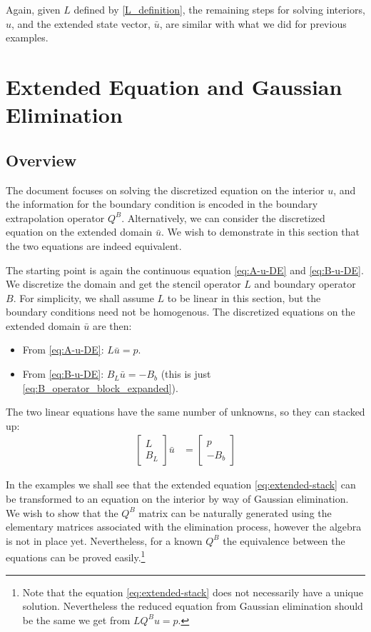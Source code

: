 \documentclass[11pt]{article}
\begin{document}
Again, given $L$ defined by \cref{L_definition}, the remaining steps for solving interiors, $u$, and the extended state vector, $\bar{u}$, are similar with what we did for previous examples.

\appendix
\section{Extended Equation and Gaussian Elimination}
\subsection{Overview}
The document focuses on solving the discretized equation on the interior $u$, and the information for the boundary condition is encoded in the boundary extrapolation operator $Q^B$. Alternatively, we can consider the discretized equation on the extended domain $\bar{u}$. We wish to demonstrate in this section that the two equations are indeed equivalent.

The starting point is again the continuous equation \cref{eq:A-u-DE} and \cref{eq:B-u-DE}. We discretize the domain and get the stencil operator $L$ and boundary operator $B$. For simplicity, we shall assume $L$ to be linear in this section, but the boundary conditions need not be homogenous. The discretized equations on the extended domain $\bar{u}$ are then:
\begin{itemize}
	\item From \cref{eq:A-u-DE}: $L\bar{u} = p$.
	\item From \cref{eq:B-u-DE}: $B_L\bar{u} = -B_b$ (this is just \cref{eq:B_operator_block_expanded}).
\end{itemize}

The two linear equations have the same number of unknowns, so they can stacked up:
\begin{align}
	\begin{bmatrix} L \\ B_L \end{bmatrix} \bar{u} &=
	\begin{bmatrix} p \\ -B_b \end{bmatrix}\label{eq:extended-stack}
\end{align}

In the examples we shall see that the extended equation \cref{eq:extended-stack} can be transformed to an equation on the interior by way of Gaussian elimination. We wish to show that the $Q^B$ matrix can be naturally generated using the elementary matrices associated with the elimination process, however the algebra is not in place yet. Nevertheless, for a known $Q^B$ the equivalence between the equations can be proved easily.\footnote{Note that the equation \cref{eq:extended-stack} does not necessarily have a unique solution. Nevertheless the reduced equation from Gaussian elimination should be the same we get from $LQ^Bu = p$.}
\end{document}

